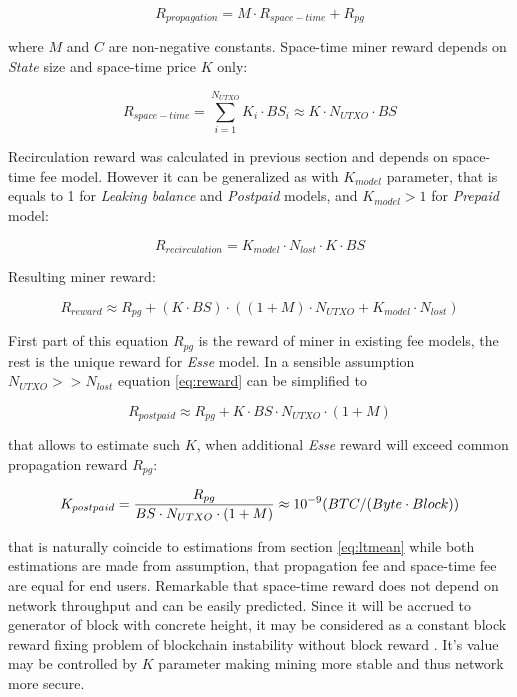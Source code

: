 \documentclass[]{article}   %
\newcommand{\authnote}[2]{\marginpar{\parbox{\marginparwidth}{\tiny %
  \textsf{#1 {\textcolor{blue}{notes: #2}}}}}%
  \textcolor{blue}{\textbf{\dag}}}
\newcommand{\authnote}[2]{
  \textsf{#1 \textcolor{blue}{: #2}}}
\newcommand{\authnote}[2]{}
\newcommand{\dnote}[1]{{\authnote{\textcolor{blue}{Dima notes}}{#1}}}
\newcommand{\esse}{\textit{Esse}}
\newcommand{\state}{\textit{State}}
\begin{document}
\begin{equation}
R_{propagation} = M \cdot R_{space-time} + R_{pg}
\end{equation}

where $M$ and $C$ are non-negative constants. Space-time miner reward depends on \state{} size and space-time price $K$ only:

\begin{equation}
R_{space-time} = \sum_{i=1}^{N_{UTXO}} K_i \cdot BS_i \approx K \cdot N_{UTXO} \cdot BS
\end{equation}

Recirculation reward was calculated in previous section and depends on space-time fee model. However it can be generalized as with $K_{model}$ parameter, that is equals to 1 for \textit{Leaking balance} and \textit{Postpaid} models, and $K_{model} > 1$ \dnote{20?} for \textit{Prepaid} model:

\begin{equation}
R_{recirculation} = {K_{model} \cdot  N_{lost} \cdot K \cdot BS}
\end{equation}

Resulting miner reward:

\begin{equation}
\label{eq:reward}
R_{reward} \approx R_{pg} + (K \cdot BS) \cdot ((1 + M) \cdot N_{UTXO} + K_{model} \cdot N_{lost})
\end{equation}

First part of this equation $R_{pg}$ is the reward of miner in existing fee models, the rest is the unique reward for \esse{} model.  In a sensible assumption $N_{UTXO} >> N_{lost}$ equation \ref{eq:reward} can be simplified to

\begin{equation}
R_{postpaid} \approx R_{pg} + K \cdot BS \cdot N_{UTXO} \cdot (1 + M)
\end{equation}

that allows to estimate such $K$, when additional \esse{} reward will exceed common propagation reward $R_{pg}$:

\begin{equation}
K_{postpaid} = {R_{pg} \over BS \cdot N_{UTXO} \cdot (1 + M)} \approx 10^{-9} ({BTC / (Byte \cdot Block)})
\end{equation}

that is naturally coincide to estimations from section \ref{eq:ltmean} while both estimations are made from assumption, that propagation fee and space-time fee are equal for end users. Remarkable that space-time reward does not depend on network throughput and can be easily predicted. Since it will be accrued to generator of block with concrete height, it may be considered as a constant block reward fixing problem of blockchain instability without block reward \cite{carlsten2016instability}. It's value may be controlled by $K$ parameter making mining more stable and thus network more secure.
\end{document}
